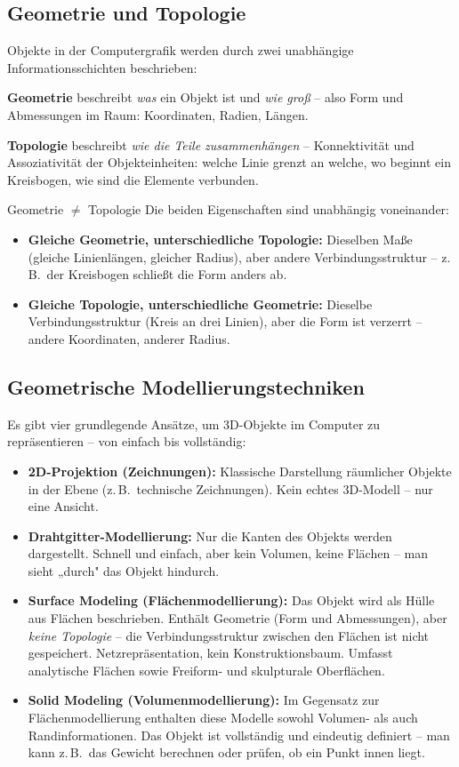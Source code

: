 \documentclass[12pt, a4paper]{article}
\begin{document}
\subsection{Geometrie und Topologie}

Objekte in der Computergrafik werden durch zwei unabhängige Informationsschichten beschrieben:

\textbf{Geometrie} beschreibt \textit{was} ein Objekt ist und \textit{wie groß} -- also Form und Abmessungen im Raum: Koordinaten, Radien, Längen.

\textbf{Topologie} beschreibt \textit{wie die Teile zusammenhängen} -- Konnektivität und Assoziativität der Objekteinheiten: welche Linie grenzt an welche, wo beginnt ein Kreisbogen, wie sind die Elemente verbunden.

\begin{notebox}{Geometrie $\neq$ Topologie}
Die beiden Eigenschaften sind unabhängig voneinander:
\begin{itemize}
  \item \textbf{Gleiche Geometrie, unterschiedliche Topologie:} Dieselben Maße (gleiche Linienlängen, gleicher Radius), aber andere Verbindungsstruktur -- z.\,B.\ der Kreisbogen schließt die Form anders ab.
  \item \textbf{Gleiche Topologie, unterschiedliche Geometrie:} Dieselbe Verbindungsstruktur (Kreis an drei Linien), aber die Form ist verzerrt -- andere Koordinaten, anderer Radius.
\end{itemize}
\end{notebox}

\subsection{Geometrische Modellierungstechniken}

Es gibt vier grundlegende Ansätze, um 3D-Objekte im Computer zu repräsentieren -- von einfach bis vollständig:

\begin{itemize}
  \item \textbf{2D-Projektion (Zeichnungen):} Klassische Darstellung räumlicher Objekte in der Ebene (z.\,B.\ technische Zeichnungen). Kein echtes 3D-Modell -- nur eine Ansicht.
  \item \textbf{Drahtgitter-Modellierung:} Nur die Kanten des Objekts werden dargestellt. Schnell und einfach, aber kein Volumen, keine Flächen -- man sieht „durch" das Objekt hindurch.
  \item \textbf{Surface Modeling (Flächenmodellierung):} Das Objekt wird als Hülle aus Flächen beschrieben. Enthält Geometrie (Form und Abmessungen), aber \textit{keine Topologie} -- die Verbindungsstruktur zwischen den Flächen ist nicht gespeichert. Netzrepräsentation, kein Konstruktionsbaum. Umfasst analytische Flächen sowie Freiform- und skulpturale Oberflächen.
  \item \textbf{Solid Modeling (Volumenmodellierung):} Im Gegensatz zur Flächenmodellierung enthalten diese Modelle sowohl Volumen- als auch Randinformationen. Das Objekt ist vollständig und eindeutig definiert -- man kann z.\,B.\ das Gewicht berechnen oder prüfen, ob ein Punkt innen liegt.
\end{itemize}
\end{document}
